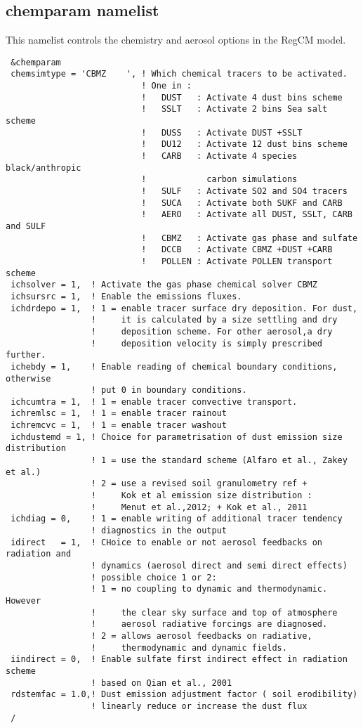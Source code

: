 \subsection{chemparam namelist}
\label{chemparam}

This namelist controls the chemistry and aerosol options in the RegCM model.

{\footnotesize
\begin{Verbatim}
 &chemparam
 chemsimtype = 'CBMZ    ', ! Which chemical tracers to be activated.
                           ! One in :
                           !   DUST   : Activate 4 dust bins scheme
                           !   SSLT   : Activate 2 bins Sea salt scheme
                           !   DUSS   : Activate DUST +SSLT
                           !   DU12   : Activate 12 dust bins scheme
                           !   CARB   : Activate 4 species black/anthropic
                           !            carbon simulations
                           !   SULF   : Activate SO2 and SO4 tracers
                           !   SUCA   : Activate both SUKF and CARB
                           !   AERO   : Activate all DUST, SSLT, CARB and SULF
                           !   CBMZ   : Activate gas phase and sulfate
                           !   DCCB   : Activate CBMZ +DUST +CARB
                           !   POLLEN : Activate POLLEN transport scheme
 ichsolver = 1,  ! Activate the gas phase chemical solver CBMZ
 ichsursrc = 1,  ! Enable the emissions fluxes.
 ichdrdepo = 1,  ! 1 = enable tracer surface dry deposition. For dust,
                 !     it is calculated by a size settling and dry
                 !     deposition scheme. For other aerosol,a dry
                 !     deposition velocity is simply prescribed further.
 ichebdy = 1,    ! Enable reading of chemical boundary conditions, otherwise
                 ! put 0 in boundary conditions.
 ichcumtra = 1,  ! 1 = enable tracer convective transport.
 ichremlsc = 1,  ! 1 = enable tracer rainout     
 ichremcvc = 1,  ! 1 = enable tracer washout 
 ichdustemd = 1, ! Choice for parametrisation of dust emission size distribution
                 ! 1 = use the standard scheme (Alfaro et al., Zakey et al.)
                 ! 2 = use a revised soil granulometry ref + 
                 !     Kok et al emission size distribution :
                 !     Menut et al.,2012; + Kok et al., 2011
 ichdiag = 0,    ! 1 = enable writing of additional tracer tendency
                 ! diagnostics in the output
 idirect   = 1,  ! CHoice to enable or not aerosol feedbacks on radiation and
                 ! dynamics (aerosol direct and semi direct effects)
                 ! possible choice 1 or 2:
                 ! 1 = no coupling to dynamic and thermodynamic. However
                 !     the clear sky surface and top of atmosphere 
                 !     aerosol radiative forcings are diagnosed.
                 ! 2 = allows aerosol feedbacks on radiative,
                 !     thermodynamic and dynamic fields.
 iindirect = 0,  ! Enable sulfate first indirect effect in radiation scheme
                 ! based on Qian et al., 2001 
 rdstemfac = 1.0,! Dust emission adjustment factor ( soil erodibility)
                 ! linearly reduce or increase the dust flux
 /
\end{Verbatim}
}

